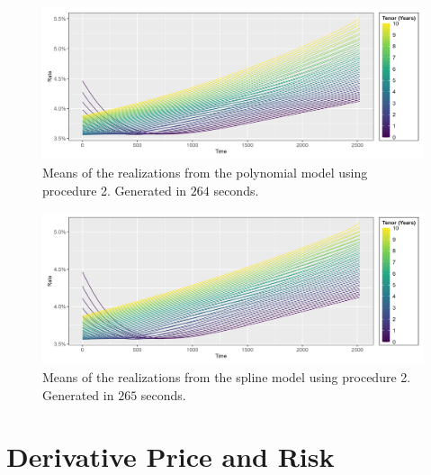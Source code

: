 \begin{figure}[!htbp]
    \centering
    \includegraphics[width=.95\linewidth]{Figures/Simulated Interest Rates/zero_coupon_yields_phase_3_HJM_2F_procedure_2_poly_model_simulated_10Y_mean_small_time_plot.png}
    
    \caption[Mean of the realizations, Polynomial Model, Procedure 2]{Means of the realizations from the polynomial model using procedure 2. Generated in $264$ seconds.}
    \label{fig:mean realizations of procedure 2, poly, 10 years into the future.}
\end{figure}

\begin{figure}[!htbp]
    \centering
    \includegraphics[width=.95\linewidth]{Figures/Simulated Interest Rates/zero_coupon_yields_phase_3_HJM_2F_procedure_2_spline_model_simulated_10Y_mean_small_time_plot.png}
    
    \caption[Mean of the realizations, Spline Model, Procedure 2]{Means of the realizations from the spline model using procedure 2. Generated in $265$ seconds.}
    \label{fig:mean realizations of procedure 2, spline, 10 years into the future.}
\end{figure}


\newpage






\newpage

\section{Derivative Price and Risk}

